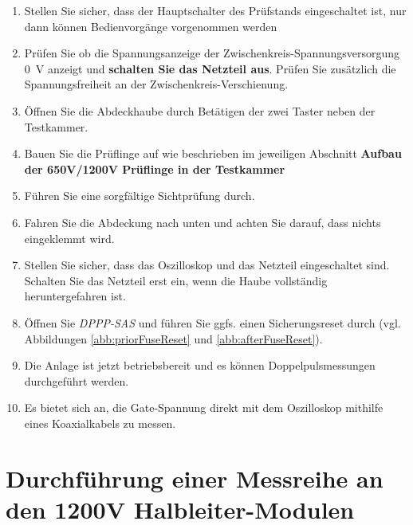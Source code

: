
\begin{enumerate}
	\item Stellen Sie sicher, dass der Hauptschalter des Prüfstands eingeschaltet ist, nur dann können Bedienvorgänge vorgenommen werden
	\item Prüfen Sie ob die Spannungsanzeige der Zwischenkreis-Spannungsversorgung \SI{0}{\volt} anzeigt und \textbf{schalten Sie das Netzteil aus}.
	Prüfen Sie zusätzlich die Spannungsfreiheit an der Zwischenkreis-Verschienung.
	\item Öffnen Sie die Abdeckhaube durch Betätigen der zwei Taster neben der Testkammer.
	\item Bauen Sie die Prüflinge auf wie beschrieben im jeweiligen Abschnitt \textbf{Aufbau der 650V/1200V Prüflinge in der Testkammer} 
	\item Führen Sie eine sorgfältige Sichtprüfung durch.
	\item Fahren Sie die Abdeckung nach unten und achten Sie darauf, dass nichts eingeklemmt wird. 
	\item Stellen Sie sicher, dass das Oszilloskop und das Netzteil eingeschaltet sind. Schalten Sie das Netzteil erst ein, wenn die Haube vollständig heruntergefahren ist.
	\item Öffnen Sie \textit{DPPP-SAS} und führen Sie ggfs. einen Sicherungsreset durch (vgl. Abbildungen \ref{abb:priorFuseReset} und \ref{abb:afterFuseReset}).
	\item Die Anlage ist jetzt betriebsbereit und es können Doppelpulsmessungen durchgeführt werden.
	\item Es bietet sich an, die Gate-Spannung direkt mit dem Oszilloskop mithilfe eines Koaxialkabels zu messen.  \\
\end{enumerate}
\section{Durchführung einer Messreihe an den 1200V Halbleiter-Modulen}


